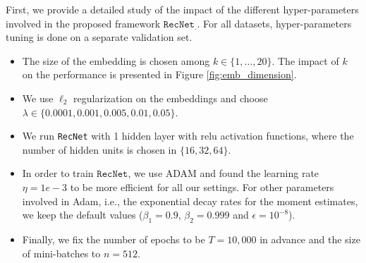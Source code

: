 \documentclass[10pt,journal,compsoc]{IEEEtran}
\newcommand{\RecNet}{\texttt{RecNet}}
\begin{document}
\begin{sloppypar}
\begin{figure*}[!h]
    \label{fig:map_batch}
\end{figure*}
\fi


First, we provide a detailed study of the impact of the different hyper-parameters involved in the proposed framework $\RecNet_.$. For all datasets, hyper-parameters tuning is done on a separate validation set.
\begin{itemize}
    \item The size of the embedding is chosen among $k \in \{1,\ldots,20\}$. The impact of $k$ on the performance is presented in Figure \ref{fig:emb_dimension}.
    \item We use $\ell_2$ regularization on the embeddings and choose $\lambda\in\{0.0001,0.001,0.005,0.01,0.05\}$.
    \item We run {\RecNet} with 1 hidden layer with relu activation functions, where the number of hidden units is chosen in $\{16,32,64\}$.
    \item In order to train $\RecNet$, we use ADAM \cite{KingmaB14} and found the learning rate $\eta=1e-3$ to be more efficient for all our settings.
    For other parameters involved in Adam, i.e., the exponential decay rates for the moment estimates, we keep the default values ($\beta_1=0.9$, $\beta_{2}=0.999$ and $\epsilon=10^{-8}$).
    \item Finally, we fix the number of epochs to be $T=10,000$ in advance and the size of mini-batches to $n=512$.

\end{itemize}
\end{sloppypar}
\end{document}
